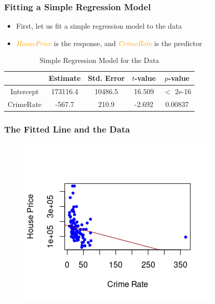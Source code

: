 \documentclass[10pt]{beamer}
\theoremstyle{plain}
\begin{document}
\begin{frame}
\frametitle{\sc Fitting a Simple Regression Model}
	\begin{itemize}
		\item First, let us fit a simple regression model to the data
		\item \textcolor{orange}{\textit{HousePrice}} is the response, and \textcolor{orange}{\textit{CrimeRate}} is the predictor
	\end{itemize}
    \begin{table}[hptb]
	\scriptsize
	\caption{\small Simple Regression Model for the Data}
	\begin{center}
		\begin{tabular}{ c c c c c} 
			\toprule
			& Estimate & Std. Error & $t$-value & $p$-value \\
			\midrule
			Intercept & 173116.4 & 10486.5 &  16.509  & $<$ 2e-16 \\
			CrimeRate & -567.7   & 210.9   &  -2.692  & 0.00837 \\ 
			\bottomrule
		\end{tabular}
		\end{center}
\end{table}
\end{frame}

\begin{frame}
\frametitle{\sc The Fitted Line and the Data}
	\begin{figure}[!ht]
		\centering
		\includegraphics[scale=0.9]{figs8/scatter-all-reg.png}
	\end{figure}
\end{frame}
\end{document}
